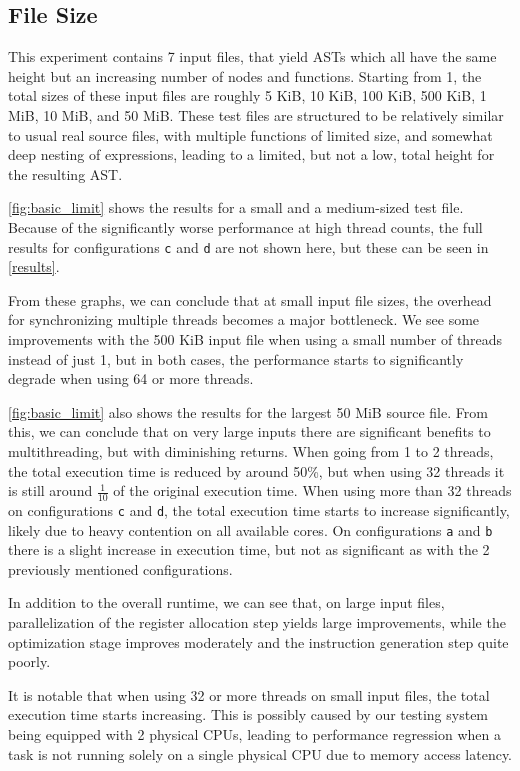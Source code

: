 \documentclass[11pt,dvipsnames]{article}
\newcommand{\mono}[1]{\texttt{#1}}
\begin{document}
\subsection{File Size} \label{filesize}
This experiment contains 7 input files, that yield ASTs which all have the same height but an increasing number of nodes and functions. Starting from 1, the total sizes of these input files are roughly 5 KiB, 10 KiB, 100 KiB, 500 KiB, 1 MiB, 10 MiB, and 50 MiB. These test files are structured to be relatively similar to usual real source files, with multiple functions of limited size, and somewhat deep nesting of expressions, leading to a limited, but not a low, total height for the resulting AST.

\autoref{fig:basic_limit} shows the results for a small and a medium-sized test file. Because of the significantly worse performance at high thread counts, the full results for configurations \mono{c} and \mono{d} are not shown here, but these can be seen in \autoref{results}.

From these graphs, we can conclude that at small input file sizes, the overhead for synchronizing multiple threads becomes a major bottleneck. We see some improvements with the 500 KiB input file when using a small number of threads instead of just 1, but in both cases, the performance starts to significantly degrade when using 64 or more threads.

\autoref{fig:basic_limit} also shows the results for the largest 50 MiB source file. From this, we can conclude that on very large inputs there are significant benefits to multithreading, but with diminishing returns. When going from 1 to 2 threads, the total execution time is reduced by around 50\%, but when using 32 threads it is still around $\frac{1}{10}$ of the original execution time. When using more than 32 threads on configurations \mono{c} and \mono{d}, the total execution time starts to increase significantly, likely due to heavy contention on all available cores. On configurations \mono{a} and \mono{b} there is a slight increase in execution time, but not as significant as with the 2 previously mentioned configurations.

In addition to the overall runtime, we can see that, on large input files, parallelization of the register allocation step yields large improvements, while the optimization stage improves moderately and the instruction generation step quite poorly.

It is notable that when using 32 or more threads on small input files, the total execution time starts increasing. This is possibly caused by our testing system being equipped with 2 physical CPUs, leading to performance regression when a task is not running solely on a single physical CPU due to memory access latency.
\end{document}
